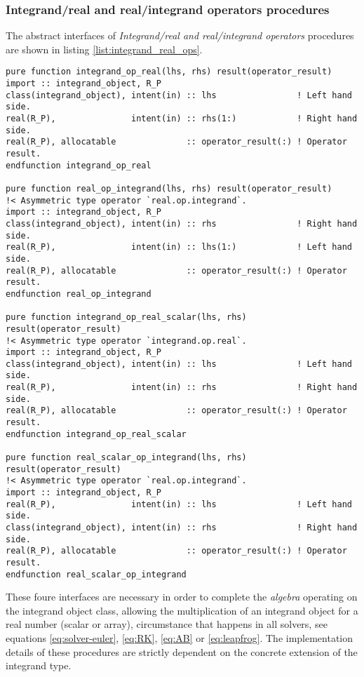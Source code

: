 \subsubsection{Integrand/real and real/integrand operators procedures}

The abstract interfaces of \emph{Integrand/real and real/integrand operators} procedures are shown in listing \ref{list:integrand_real_ops}.

\begin{lstlisting}[firstnumber=1,style=code,caption={Integrand/real and real/integrand operators procedure interfaces},label={list:integrand_real_ops}]
pure function integrand_op_real(lhs, rhs) result(operator_result)
import :: integrand_object, R_P
class(integrand_object), intent(in) :: lhs                ! Left hand side.
real(R_P),               intent(in) :: rhs(1:)            ! Right hand side.
real(R_P), allocatable              :: operator_result(:) ! Operator result.
endfunction integrand_op_real

pure function real_op_integrand(lhs, rhs) result(operator_result)
!< Asymmetric type operator `real.op.integrand`.
import :: integrand_object, R_P
class(integrand_object), intent(in) :: rhs                ! Right hand side.
real(R_P),               intent(in) :: lhs(1:)            ! Left hand side.
real(R_P), allocatable              :: operator_result(:) ! Operator result.
endfunction real_op_integrand

pure function integrand_op_real_scalar(lhs, rhs) result(operator_result)
!< Asymmetric type operator `integrand.op.real`.
import :: integrand_object, R_P
class(integrand_object), intent(in) :: lhs                ! Left hand side.
real(R_P),               intent(in) :: rhs                ! Right hand side.
real(R_P), allocatable              :: operator_result(:) ! Operator result.
endfunction integrand_op_real_scalar

pure function real_scalar_op_integrand(lhs, rhs) result(operator_result)
!< Asymmetric type operator `real.op.integrand`.
import :: integrand_object, R_P
real(R_P),               intent(in) :: lhs                ! Left hand side.
class(integrand_object), intent(in) :: rhs                ! Right hand side.
real(R_P), allocatable              :: operator_result(:) ! Operator result.
endfunction real_scalar_op_integrand
\end{lstlisting}

These foure interfaces are necessary in order to complete the \emph{algebra} operating on the integrand object class, allowing the multiplication of an integrand object for a real number (scalar or array), circumstance that happens in all solvers, see equations \ref{eq:solver-euler}, \ref{eq:RK}, \ref{eq:AB} or \ref{eq:leapfrog}. The implementation details of these procedures are strictly dependent on the concrete extension of the integrand type.

